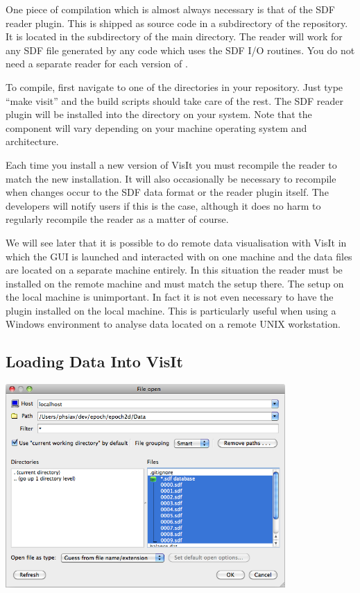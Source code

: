   One piece of compilation which is almost always necessary is that of
  the SDF reader plugin. This is shipped as source code in a subdirectory
  of the {\EPOCH} repository. It is located in the  subdirectory
  of the main  directory. The reader will work for any
  SDF file generated by any code which uses the SDF I/O routines. You do
  not need a separate reader for each version of {\EPOCH}.

  To compile, first navigate to one of the  directories in your
  {\EPOCH} repository. Just type ``make visit'' and the build scripts should
  take care of the rest.
  The SDF reader plugin will be installed into the directory
   on your system.
  Note that the  component will vary depending on
  your machine operating system and architecture.

  Each time you install a new version of VisIt you must recompile the reader
  to match the new installation. It will also occasionally be necessary to
  recompile when changes occur to the SDF data format or the reader plugin
  itself. The developers will notify users if this is the case, although
  it does no harm to regularly recompile the reader as a matter of course.

  We will see later that it is possible to do remote data visualisation
  with VisIt in which the GUI is launched and interacted with on one
  machine and the data files are located on a separate machine entirely.
  In this situation the reader must be installed on the remote machine and
  must match the setup there. The setup on the local machine is unimportant.
  In fact it is not even necessary to have the plugin installed on the
  local machine. This is particularly useful when using a Windows environment
  to analyse data located on a remote UNIX workstation.

\subsection{Loading Data Into VisIt}
  \begin{center}
    \includegraphics[width=0.8\textwidth]{images/visit_db_list}
  \end{center}

